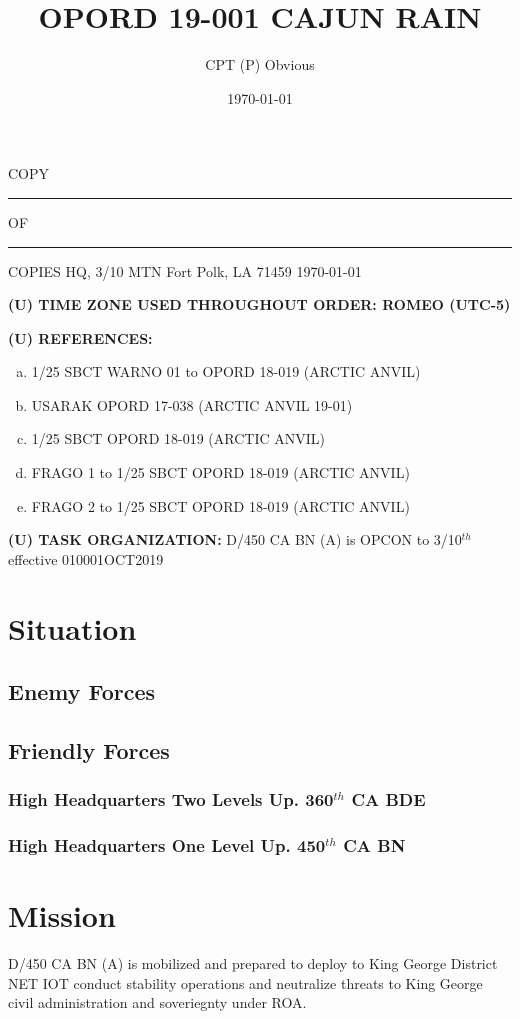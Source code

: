 \documentclass[12pt,letterpaper,notitlepage]{article}
\title{OPORD 19-001 CAJUN RAIN}
\author{CPT (P) Obvious}
\date{\today}
\renewcommand*{\DTMdisplaydate}[4]{%
		\DTMtwodigits{##3} \Milshortmonthname{##2} ##1} %
\newcommand{\Milshortmonthname}[1]{%
	\ifcase#1%
	  \or JAN%
	  \or FEB%
	  \or MAR%
	  \or APR%
	  \or MAY%
	  \or JUN%
	  \or JUL%
	  \or AUG%
	  \or SEP%
	  \or OCT%
	  \or NOV%
	  \or DEC%
	\fi
}
\newcommand{\unclass}{(U)}
\newcommand{\uptwo}{360$^{th}$ CA BDE}
\newcommand{\upone}{450$^{th}$ CA BN}
\newcommand{\unit}{D/450 CA BN (A)}
\newcommand{\timezone}{ROMEO (UTC-5)}
\begin{document}

\begin{flushright}
COPY \rule{1cm}{0.4pt} OF \rule{1cm}{0.4pt} COPIES \linebreak
HQ, 3/10 MTN \linebreak
Fort Polk, LA 71459 \linebreak
\today
\end{flushright}

\textbf{\unclass{} TIME ZONE USED THROUGHOUT ORDER: \timezone}

\textbf{\unclass{} REFERENCES:}
\begin{enumerate}[(a)]
\item 1/25 SBCT WARNO 01 to OPORD 18-019 (ARCTIC ANVIL)
\item USARAK OPORD 17-038 (ARCTIC ANVIL 19-01)
\item 1/25 SBCT OPORD 18-019 (ARCTIC ANVIL)
\item FRAGO 1 to 1/25 SBCT OPORD 18-019 (ARCTIC ANVIL)
\item FRAGO 2 to 1/25 SBCT OPORD 18-019 (ARCTIC ANVIL)
\end{enumerate}

\textbf{\unclass{} TASK ORGANIZATION:}
\unit{} is OPCON to 3/10$^{th}$ effective 010001OCT2019

\section{Situation}
\subsection{Enemy Forces}
\subsection{Friendly Forces}
\subsubsection{High Headquarters Two Levels Up. \uptwo{}}
\subsubsection{High Headquarters One Level Up. \upone{}}

\section{Mission}
\unit{}
is mobilized and prepared to deploy 
to King George District
NET 
IOT conduct stability operations and neutralize threats to King George civil
	administration and soveriegnty under ROA.
\end{document}

